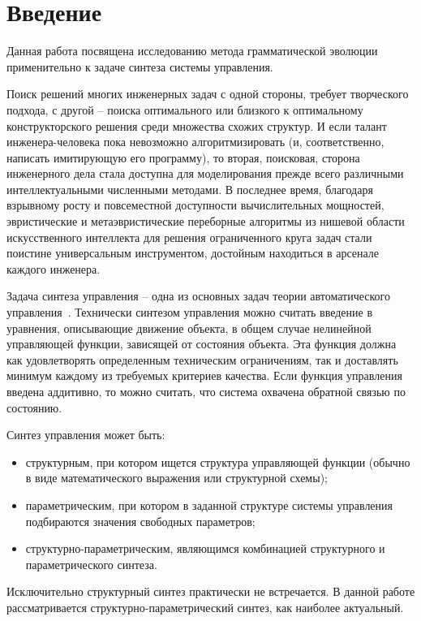 \chapter*{Введение}

Данная работа посвящена исследованию метода грамматической эволюции применительно к задаче синтеза системы управления.

Поиск решений многих инженерных задач с одной стороны, требует творческого подхода, с другой -- поиска оптимального или близкого к оптимальному конструкторского решения среди множества схожих структур.
И если талант инженера-человека пока невозможно алгоритмизировать (и, соответственно, написать имитирующую его программу), то вторая, поисковая, сторона инженерного дела стала доступна для моделирования прежде всего различными интеллектуальными численными методами.
В последнее время, благодаря взрывному росту и повсеместной доступности вычислительных мощностей, эвристические и метаэвристические переборные алгоритмы из нишевой области искусственного интеллекта для решения ограниченного круга задач стали поистине универсальным инструментом, достойным находиться в арсенале каждого инженера.

Задача синтеза управления -- одна из основных задач теории автоматического управления~\cite{Дивеев2011}.
Технически синтезом управления можно считать введение в уравнения, описывающие движение объекта, в общем случае нелинейной управляющей функции, зависящей от состояния объекта.
Эта функция должна как удовлетворять определенным техническим ограничениям, так и доставлять минимум каждому из требуемых критериев качества.
Если функция управления введена аддитивно, то можно считать, что система охвачена обратной связью по состоянию.

Синтез управления может быть:
\begin{itemize}
    \item структурным, при котором ищется структура управляющей функции (обычно в виде математического выражения или структурной схемы);
    \item параметрическим, при котором в заданной структуре системы управления подбираются значения свободных параметров;
    \item структурно-параметрическим, являющимся комбинацией структурного и параметрического синтеза.
\end{itemize}
Исключительно структурный синтез практически не встречается.
В данной работе рассматривается структурно-параметрический синтез, как наиболее актуальный.

